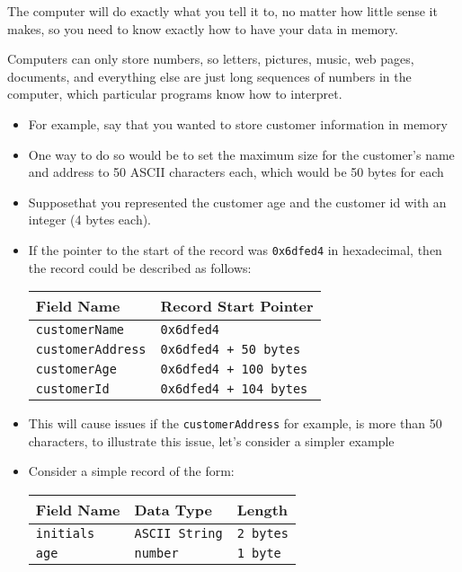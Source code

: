 \documentclass{article}
\newcommand {\code}{\texttt}
\begin{document}
	The computer will do exactly what you tell it to, no matter how little sense it
	makes, so you need to know exactly how to have your data in memory.
	
	Computers can only store numbers, so letters, pictures, music, web pages, documents,
	and everything else are just long sequences of numbers in the computer, which
	particular programs know how to interpret.
	\begin  {itemize}
		\item For example, say that you wanted to store customer information in memory
		\item One way to do so would be to set the maximum size for the customer's 
			name and address to 50 ASCII characters each, which would be 
			50 bytes for each
		\item Supposethat  you represented the customer age and the customer id 
			with an integer (4 bytes each).
		\item If the pointer to the start of the record was \code {0x6dfed4} in 
			hexadecimal, then the record could be described as follows:
			\begin {center}
				\label {ref:fixed_width_data}
				\begin {tabular}{ll}
					\hline
					\textbf {Field Name} 	&	\textbf {Record Start Pointer}	\\
					\hline
					\code {customerName}		&	\code {0x6dfed4}					\\
					\code {customerAddress}	&	\code {0x6dfed4 + 50 bytes}		\\
					\code {customerAge}		&	\code {0x6dfed4 + 100 bytes}		\\
					\code {customerId}		&	\code {0x6dfed4 + 104 bytes}		\\
					\hline	
				\end {tabular}
			\end {center}
		\item This will cause issues if the \code {customerAddress} for example, is
			more than 50 characters, to illustrate this issue, let's consider a simpler
			example
		\item Consider a simple record of the form:
			\begin {center}
				\begin {tabular}{lll}
					\hline					
					\textbf {Field Name}	& \textbf {Data Type}	& \textbf {Length}	\\
					\hline
					\code {initials}		& \code {ASCII String}	& \code {2 bytes}	\\
					\code {age}			& \code {number}			& \code {1 byte}		\\

\end{tabular}
\end{center}
\end{itemize}
\end{document}
